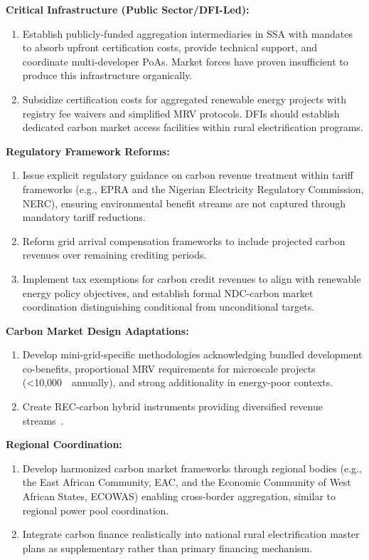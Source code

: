 \noindent\textbf{Critical Infrastructure (Public Sector/DFI-Led):}
\begin{enumerate}
    \item Establish publicly-funded aggregation intermediaries in SSA with mandates to absorb upfront certification costs, provide technical support, and coordinate multi-developer PoAs. Market forces have proven insufficient to produce this infrastructure organically.
    \item Subsidize certification costs for aggregated renewable energy projects with registry fee waivers and simplified MRV protocols. DFIs should establish dedicated carbon market access facilities within rural electrification programs.
\end{enumerate}

\noindent\textbf{Regulatory Framework Reforms:}
\begin{enumerate}[resume]
    \item Issue explicit regulatory guidance on carbon revenue treatment within tariff frameworks (e.g., EPRA and the Nigerian Electricity Regulatory Commission, NERC), ensuring environmental benefit streams are not captured through mandatory tariff reductions.
    \item Reform grid arrival compensation frameworks to include projected carbon revenues over remaining crediting periods.~\cite{tenenbaum2014}
    \item Implement tax exemptions for carbon credit revenues to align with renewable energy policy objectives, and establish formal NDC-carbon market coordination distinguishing conditional from unconditional targets.~\cite{glasgow}
\end{enumerate}

\noindent\textbf{Carbon Market Design Adaptations:}
\begin{enumerate}[resume]
    \item Develop mini-grid-specific methodologies acknowledging bundled development co-benefits, proportional MRV requirements for microscale projects (<10,000~\tcooe\ annually), and strong additionality in energy-poor contexts.
    \item Create REC-carbon hybrid instruments providing diversified revenue streams~\cite{rrecs}.
\end{enumerate}

\noindent\textbf{Regional Coordination:}
\begin{enumerate}[resume]
    \item Develop harmonized carbon market frameworks through regional bodies (e.g., the East African Community, EAC, and the Economic Community of West African States, ECOWAS) enabling cross-border aggregation, similar to regional power pool coordination.~\cite{afdb2023}
    \item Integrate carbon finance realistically into national rural electrification master plans as supplementary rather than primary financing mechanism.
\end{enumerate}

